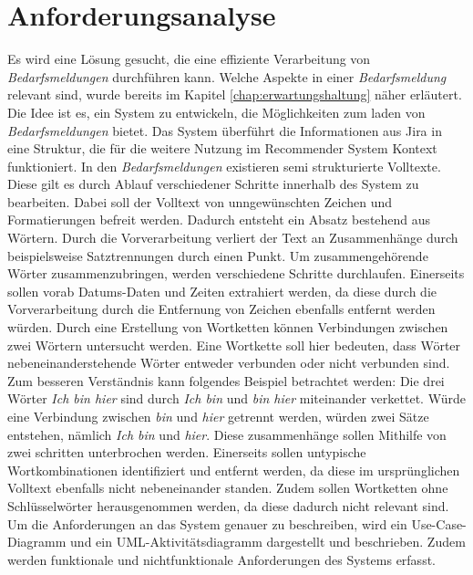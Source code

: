 \section{Anforderungsanalyse}
\label{sec:anforderungsanalyse}
Es wird eine Lösung gesucht, die eine effiziente Verarbeitung von \emph{Bedarfsmeldungen} durchführen kann. Welche Aspekte in einer \emph{Bedarfsmeldung} relevant sind, wurde bereits im Kapitel \ref{chap:erwartungshaltung} näher erläutert. Die Idee ist es, ein System zu entwickeln, die Möglichkeiten zum laden von \emph{Bedarfsmeldungen} bietet. Das System überführt die Informationen aus Jira in eine Struktur, die für die weitere Nutzung im Recommender System Kontext funktioniert. In den \emph{Bedarfsmeldungen} existieren semi strukturierte Volltexte. Diese gilt es durch Ablauf verschiedener Schritte innerhalb des System zu bearbeiten. Dabei soll der Volltext von unngewünschten Zeichen und Formatierungen befreit werden. Dadurch entsteht ein Absatz bestehend aus Wörtern. Durch die Vorverarbeitung verliert der Text an Zusammenhänge durch beispielsweise Satztrennungen durch einen Punkt. Um zusammengehörende Wörter zusammenzubringen, werden verschiedene Schritte durchlaufen. Einerseits sollen vorab Datums-Daten und Zeiten extrahiert werden, da diese durch die Vorverarbeitung durch die Entfernung von Zeichen ebenfalls entfernt werden würden. Durch eine Erstellung von Wortketten können Verbindungen zwischen zwei Wörtern untersucht werden. Eine Wortkette soll hier bedeuten, dass Wörter nebeneinanderstehende Wörter entweder verbunden oder nicht verbunden sind. Zum besseren Verständnis kann folgendes Beispiel betrachtet werden: Die drei Wörter \emph{Ich bin hier} sind durch \emph{Ich bin} und \emph{bin hier} miteinander verkettet. Würde eine Verbindung zwischen \emph{bin} und \emph{hier} getrennt werden, würden zwei Sätze entstehen, nämlich \emph{Ich bin} und \emph{hier}. Diese zusammenhänge sollen Mithilfe von zwei schritten unterbrochen werden. Einerseits sollen untypische Wortkombinationen identifiziert und entfernt werden, da diese im ursprünglichen Volltext ebenfalls nicht nebeneinander standen. Zudem sollen Wortketten ohne Schlüsselwörter herausgenommen werden, da diese dadurch nicht relevant sind. Um die Anforderungen an das System genauer zu beschreiben, wird ein Use-Case-Diagramm und ein UML-Aktivitätsdiagramm dargestellt und beschrieben. Zudem werden funktionale und nichtfunktionale Anforderungen des Systems erfasst.
